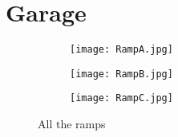 \section{Garage}
\begin{figure}
	\begin{subfigure}{.3\linewidth}
		\centering
		\texttt{[image: RampA.jpg]}
		\caption{}
	\end{subfigure}
	\hfill
	\begin{subfigure}{.3\linewidth}
		\centering
		\texttt{[image: RampB.jpg]}
		\caption{}
	\end{subfigure}
	\hfill
	\begin{subfigure}{.3\linewidth}
		\centering
		\texttt{[image: RampC.jpg]}
		\caption{}
	\end{subfigure}
	\caption{All the ramps}
	\label{fig:all_ramps}
\end{figure}

